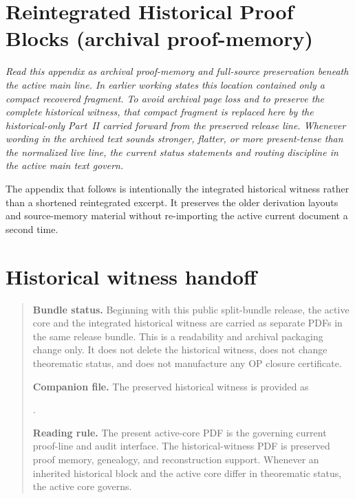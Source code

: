 \clearpage
\section{Reintegrated Historical Proof Blocks (archival proof-memory)}
\label{app:formal-reintegrated}

\textit{Read this appendix as archival proof-memory and full-source preservation beneath the active main line. In earlier working states this location contained only a compact recovered fragment. To avoid archival page loss and to preserve the complete historical witness, that compact fragment is replaced here by the historical-only Part~II carried forward from the preserved  release line. Whenever wording in the archived text sounds stronger, flatter, or more present-tense than the normalized live line, the current status statements and routing discipline in the active main text govern.}

\begin{remark}
The appendix that follows is intentionally the integrated historical witness rather than a shortened reintegrated excerpt. It preserves the older derivation layouts and source-memory material without re-importing the active current document a second time.
\end{remark}


\clearpage
\section*{Historical witness handoff}
\begin{quote}\small
\noindent\textbf{Bundle status.} Beginning with this public split-bundle release, the active core and the integrated historical witness are carried as separate PDFs in the same release bundle. This is a readability and archival packaging change only. It does not delete the historical witness, does not change theorematic status, and does not manufacture any OP closure certificate.

\medskip
\noindent\textbf{Companion file.} The preserved historical witness is provided as\par
{}.

\medskip
\noindent\textbf{Reading rule.} The present active-core PDF is the governing current proof-line and audit interface. The historical-witness PDF is preserved proof memory, genealogy, and reconstruction support. Whenever an inherited historical block and the active core differ in theorematic status, the active core governs.
\end{quote}



\clearpage
